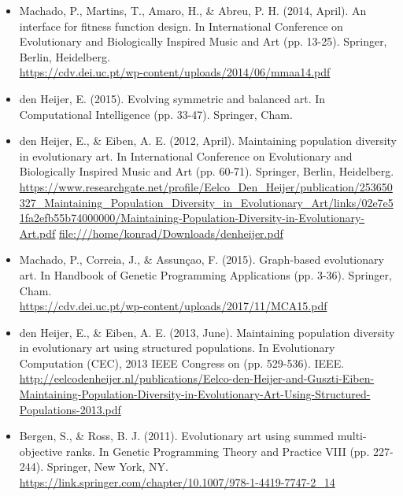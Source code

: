 \documentclass[10pt,a4paper]{article}
\begin{document}
\begin{itemize}
	\item Machado, P., Martins, T., Amaro, H., \& Abreu, P. H. (2014, April). An interface for fitness function design. In International Conference on Evolutionary and Biologically Inspired Music and Art (pp. 13-25). Springer, Berlin, Heidelberg.
	\\
	\url{https://cdv.dei.uc.pt/wp-content/uploads/2014/06/mmaa14.pdf}
	
	\item den Heijer, E. (2015). Evolving symmetric and balanced art. In Computational Intelligence (pp. 33-47). Springer, Cham.
	
	\item den Heijer, E., \& Eiben, A. E. (2012, April). Maintaining population diversity in evolutionary art. In International Conference on Evolutionary and Biologically Inspired Music and Art (pp. 60-71). Springer, Berlin, Heidelberg.
	\\
	\url{https://www.researchgate.net/profile/Eelco_Den_Heijer/publication/253650327_Maintaining_Population_Diversity_in_Evolutionary_Art/links/02e7e51fa2efb55b74000000/Maintaining-Population-Diversity-in-Evolutionary-Art.pdf}
	\url{file:///home/konrad/Downloads/denheijer.pdf}
	
	\item Machado, P., Correia, J., \& Assunçao, F. (2015). Graph-based evolutionary art. In Handbook of Genetic Programming Applications (pp. 3-36). Springer, Cham.
	\\
	\url{https://cdv.dei.uc.pt/wp-content/uploads/2017/11/MCA15.pdf}
	
	\item den Heijer, E., \& Eiben, A. E. (2013, June). Maintaining population diversity in evolutionary art using structured populations. In Evolutionary Computation (CEC), 2013 IEEE Congress on (pp. 529-536). IEEE.
	\\
	\url{http://eelcodenheijer.nl/publications/Eelco-den-Heijer-and-Guszti-Eiben-Maintaining-Population-Diversity-in-Evolutionary-Art-Using-Structured-Populations-2013.pdf}
	
	\item Bergen, S., \& Ross, B. J. (2011). Evolutionary art using summed multi-objective ranks. In Genetic Programming Theory and Practice VIII (pp. 227-244). Springer, New York, NY.
	\\
	\url{https://link.springer.com/chapter/10.1007/978-1-4419-7747-2_14}
	
	
\end{itemize}
\end{document}
